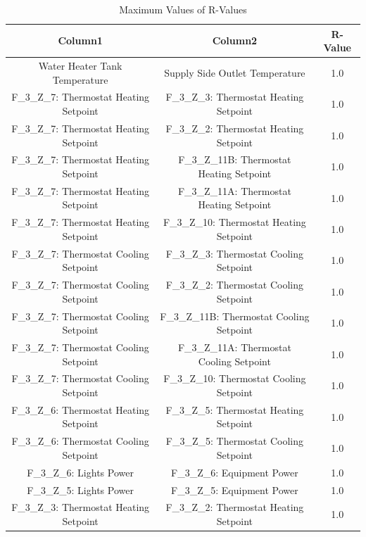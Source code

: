 \documentclass[aps, 10pt, a4paper]{article}
\begin{document}
                \begin{longtable}{c|c||c}
                    \caption{Maximum Values of R-Values} \\
                    \label{tb:rmax}
                    Column1 & Column2 & R-Value \\ \hline
                    \endhead
                    Water Heater Tank Temperature & Supply Side Outlet Temperature & 1.0 \\
                    F\_3\_Z\_7: Thermostat Heating Setpoint & F\_3\_Z\_3: Thermostat Heating Setpoint & 1.0 \\
                    F\_3\_Z\_7: Thermostat Heating Setpoint & F\_3\_Z\_2: Thermostat Heating Setpoint & 1.0 \\
                    F\_3\_Z\_7: Thermostat Heating Setpoint & F\_3\_Z\_11B: Thermostat Heating Setpoint & 1.0 \\
                    F\_3\_Z\_7: Thermostat Heating Setpoint & F\_3\_Z\_11A: Thermostat Heating Setpoint & 1.0 \\
                    F\_3\_Z\_7: Thermostat Heating Setpoint & F\_3\_Z\_10: Thermostat Heating Setpoint & 1.0 \\
                    F\_3\_Z\_7: Thermostat Cooling Setpoint & F\_3\_Z\_3: Thermostat Cooling Setpoint & 1.0 \\
                    F\_3\_Z\_7: Thermostat Cooling Setpoint & F\_3\_Z\_2: Thermostat Cooling Setpoint & 1.0 \\
                    F\_3\_Z\_7: Thermostat Cooling Setpoint & F\_3\_Z\_11B: Thermostat Cooling Setpoint & 1.0 \\
                    F\_3\_Z\_7: Thermostat Cooling Setpoint & F\_3\_Z\_11A: Thermostat Cooling Setpoint & 1.0 \\
                    F\_3\_Z\_7: Thermostat Cooling Setpoint & F\_3\_Z\_10: Thermostat Cooling Setpoint & 1.0 \\
                    F\_3\_Z\_6: Thermostat Heating Setpoint & F\_3\_Z\_5: Thermostat Heating Setpoint & 1.0 \\
                    F\_3\_Z\_6: Thermostat Cooling Setpoint & F\_3\_Z\_5: Thermostat Cooling Setpoint & 1.0 \\
                    F\_3\_Z\_6: Lights Power & F\_3\_Z\_6: Equipment Power & 1.0 \\
                    F\_3\_Z\_5: Lights Power & F\_3\_Z\_5: Equipment Power & 1.0 \\
                    F\_3\_Z\_3: Thermostat Heating Setpoint & F\_3\_Z\_2: Thermostat Heating Setpoint & 1.0 \\

\end{longtable}
\end{document}

